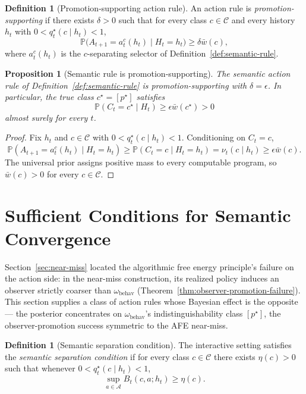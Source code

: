 \documentclass[11pt]{article}
\newtheorem{proposition}[theorem]{Proposition}
\theoremstyle{definition}
\newtheorem{definition}[theorem]{Definition}
\theoremstyle{remark}
\newcommand{\Acal}{\mathcal{A}}
\newcommand{\Ccal}{\mathcal{C}}
\newcommand{\Prob}{\mathbb{P}}
\begin{document}
\begin{definition}[Promotion-supporting action rule]
\label{def:promotion-supporting}
An action rule is \emph{promotion-supporting} if there exists $\delta>0$ such that for every class $c\in\Ccal$ and every history $h_t$ with $0<q_t^\star(c\mid h_t)<1$,
\[
\Prob\bigl(A_{t+1}=a_t^c(h_t)\mid H_t=h_t\bigr)\ge \delta\bar w(c),
\]
where $a_t^c(h_t)$ is the $c$-separating selector of Definition~\ref{def:semantic-rule}.
\end{definition}

\begin{proposition}[Semantic rule is promotion-supporting]
\label{prop:semantic-is-promotion-supporting}
The semantic action rule of Definition~\ref{def:semantic-rule} is promotion-supporting with $\delta=\epsilon$. In particular, the true class $c^\star=[p^\star]$ satisfies
\[
\Prob(C_t=c^\star\mid H_t)\ge\epsilon\bar w(c^\star)>0
\]
almost surely for every $t$.
\end{proposition}

\begin{proof}
Fix $h_t$ and $c\in\Ccal$ with $0<q_t^\star(c\mid h_t)<1$. Conditioning on $C_t=c$,
\[
\Prob(A_{t+1}=a_t^c(h_t)\mid H_t=h_t)\ge\Prob(C_t=c\mid H_t=h_t)=\nu_t(c\mid h_t)\ge\epsilon\bar w(c).
\]
The universal prior assigns positive mass to every computable program, so $\bar w(c)>0$ for every $c\in\Ccal$.
\end{proof}

\section{Sufficient Conditions for Semantic Convergence}
\label{sec:main}

Section~\ref{sec:near-miss} located the algorithmic free energy principle's failure on the action side: in the near-miss construction, its realized policy induces an observer strictly coarser than $\omega_{\mathrm{behav}}$ (Theorem~\ref{thm:observer-promotion-failure}). This section supplies a class of action rules whose Bayesian effect is the opposite --- the posterior concentrates on $\omega_{\mathrm{behav}}$'s indistinguishability class $[p^\star]$, the observer-promotion success symmetric to the AFE near-miss.

\begin{definition}[Semantic separation condition]
\label{def:sep-condition}
The interactive setting satisfies the \emph{semantic separation condition} if for every class $c\in\Ccal$ there exists $\eta(c)>0$ such that whenever $0<q_t^\star(c\mid h_t)<1$,
\[
\sup_{a\in\Acal}B_t(c,a;h_t)\ge \eta(c).
\]
\end{definition}
\end{document}
